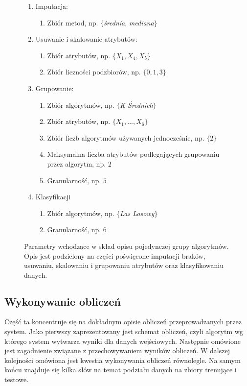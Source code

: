 \documentclass[../thesis.tex]{subfiles}
\begin{document}
\begin{figure}[h]
\centering
\begin{framed}
  \begin{enumerate}
    \item Imputacja: 
    \begin{enumerate}
      \item Zbiór metod, np. $\{$\emph{średnia}, \emph{mediana}$\}$
    \end{enumerate}
    \item Usuwanie i skalowanie atrybutów:
    \begin{enumerate}
      \item Zbiór atrybutów, np. $\{X_1, X_4, X_5\}$
      \item Zbiór liczności podzbiorów, np. $\{0, 1, 3\}$
    \end{enumerate}
    \item Grupowanie:
    \begin{enumerate}
      \item Zbiór algorytmów, np. $\{$\emph{K-Średnich}$\}$
      \item Zbiór atrybutów, np. $\{X_1, ..., X_6\}$
      \item Zbiór liczb algorytmów używanych jednocześnie, np. $\{2\}$
      \item Maksymalna liczba atrybutów podlegających grupowaniu przez algorytm, np. $2$
      \item Granularność, np. $5$
    \end{enumerate}
    \item Klasyfikacji
    \begin{enumerate}
      \item Zbiór algorytmów, np. $\{$\emph{Las Losowy}$\}$
      \item Granularność, np. $6$
    \end{enumerate}
  \end{enumerate}
\end{framed}
\caption{Parametry wchodzące w skład opisu pojedynczej grupy algorytmów. Opis jest podzielony na części poświęcone imputacji braków, usuwaniu, skalowaniu i grupowaniu atrybutów oraz klasyfikowaniu danych.}
\label{req:as}
\end{figure}

\subsection{Wykonywanie obliczeń}

Część ta koncentruje się na dokładnym opisie obliczeń przeprowadzanych przez system. Jako pierwszy zaprezentowany jest schemat obliczeń, czyli algorytm wg którego system wytwarza wyniki dla danych wejściowych. Następnie omówione jest zagadnienie związane z przechowywaniem wyników obliczeń. W dalszej kolejności omówiona jest kwestia wykonywania obliczeń równolegle. Na samym końcu znajduje się kilka słów na temat podziału danych na zbiory trenujące i testowe.
\end{document}
